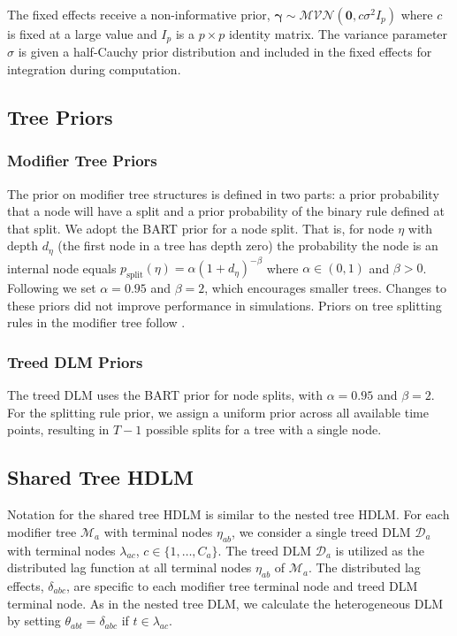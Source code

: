 \documentclass[12pt]{article}
\begin{document}
The fixed effects receive a non-informative prior, $\boldsymbol\gamma\sim\mathcal{MVN}(\mathbf{0},c\sigma^2I_p)$ where $c$ is fixed at a large value and $I_p$ is a $p\times p$ identity matrix. The variance parameter $\sigma$ is given a half-Cauchy prior distribution and included in the fixed effects for integration during computation.

\subsection{Tree Priors}
\subsubsection{Modifier Tree Priors}

The prior on modifier tree structures is defined in two parts: a prior probability that a node will have a split and a prior probability of the binary rule defined at that split. We adopt the BART prior for a node split. That is, for node $\eta$ with depth $d_\eta$ (the first node in a tree has depth zero) the probability the node is an internal node equals $p_{\text{split}}(\eta)=\alpha(1+d_\eta)^{-\beta}$ where $\alpha\in(0,1)$ and $\beta>0$. Following \cite{Chipman2012} we set $\alpha=0.95$ and $\beta=2$, which encourages smaller trees. Changes to these priors did not improve performance in simulations. Priors on tree splitting rules in the modifier tree follow \cite{Linero2018b}.

\subsubsection{Treed DLM Priors}

The treed DLM uses the BART prior for node splits, with $\alpha=0.95$ and $\beta=2$. For the splitting rule prior, we assign a uniform prior across all available time points, resulting in $T-1$ possible splits for a tree with a single node.



\subsection{Shared Tree HDLM}
Notation for the shared tree HDLM is similar to the nested tree HDLM. For each modifier tree $\mathcal{M}_a$ with terminal nodes $\eta_{ab}$, we consider a single treed DLM $\mathcal{D}_a$ with terminal nodes $\lambda_{ac}$, $c\in\{1,\ldots,C_a\}$. The treed DLM $\mathcal{D}_a$ is utilized as the distributed lag function at all terminal nodes $\eta_{ab}$ of $\mathcal{M}_a$. The distributed lag effects, $\delta_{abc}$, are specific to each modifier tree terminal node and treed DLM terminal node. As in the nested tree DLM, we calculate the heterogeneous DLM by setting $\theta_{abt}=\delta_{abc}$ if $t\in\lambda_{ac}$.
\end{document}
